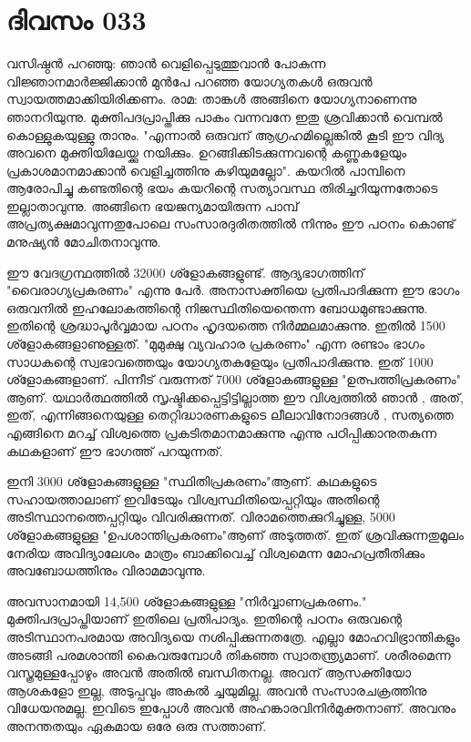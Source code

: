 \newpage
\section{ദിവസം 033}


വസിഷ്ഠന്‍ പറഞ്ഞു: ഞാന്‍ വെളിപ്പെടുത്തുവാന്‍ പോകുന്ന വിജ്ഞാനമാര്‍ജ്ജിക്കാന്‍ മുന്‍പേ പറഞ്ഞ യോഗ്യതകള്‍ ഒരുവന്‍ സ്വായത്തമാക്കിയിരിക്കണം. രാമ: താങ്കള്‍ അങ്ങിനെ യോഗ്യനാണെന്നു ഞാനറിയുന്നു. മുക്തിപദപ്രാപ്തിക്കു പാകം വന്നവനേ ഇതു ശ്രവിക്കാന്‍ വെമ്പല്‍ കൊള്ളുകയുള്ളു താനും. "എന്നാല്‍ ഒരുവന്‌ ആഗ്രഹമില്ലെങ്കില്‍ കൂടി ഈ വിദ്യ അവനെ മുക്തിയിലേയ്ക്കു നയിക്കും. ഉറങ്ങിക്കിടക്കുന്നവന്റെ കണ്ണുകളേയും പ്രകാശമാനമാക്കാന്‍ വെളിച്ചത്തിനു കഴിയുമല്ലോ". കയറില്‍ പാമ്പിനെ ആരോപിച്ചു കണ്ടതിന്റെ ഭയം കയറിന്റെ സത്യാവസ്ഥ തിരിച്ചറിയുന്നതോടെ ഇല്ലാതാവുന്നു. അങ്ങിനെ ഭയജന്യമായിരുന്ന പാമ്പ്‌ അപ്രത്യക്ഷമാവുന്നതുപോലെ സംസാരദുരിതത്തില്‍ നിന്നും ഈ പഠനം കൊണ്ട്‌ മനുഷ്യന്‍ മോചിതനാവുന്നു.

ഈ വേദഗ്രന്ഥത്തില്‍ 32000 ശ്ളോകങ്ങളുണ്ട്‌. ആദ്യഭാഗത്തിന്‌  "വൈരാഗ്യപ്രകരണം" എന്നു പേര്‍. അനാസക്തിയെ പ്രതിപാദിക്കുന്ന ഈ ഭാഗം ഒരുവനില്‍ ഇഹലോകത്തിന്റെ നിജസ്ഥിതിയെന്തെന്ന ബോധമുണ്ടാക്കുന്നു. ഇതിന്റെ ശ്രദ്ധാപൂര്‍വ്വമായ പഠനം ഹൃദയത്തെ നിര്‍മ്മലമാക്കുന്നു. ഇതില്‍ 1500 ശ്ളോകങ്ങളാണുള്ളത്‌. "മുമുക്ഷു വ്യവഹാര പ്രകരണം" എന്ന രണ്ടാം ഭാഗം സാധകന്റെ സ്വഭാവത്തെയും യോഗ്യതകളേയും പ്രതിപാദിക്കുന്നു. ഇത്‌ 1000 ശ്ളോകങ്ങളാണ്‌. പിന്നീട്‌ വരുന്നത്‌ 7000 ശ്ളോകങ്ങളുള്ള "ഉത്പത്തിപ്രകരണം" ആണ്‌. യഥാര്‍ത്ഥത്തില്‍ സൃഷ്ടിക്കപ്പെട്ടിട്ടില്ലാത്ത ഈ വിശ്വത്തില്‍ ഞാന്‍ , അത്‌, ഇത്‌, എന്നിങ്ങനെയുള്ള തെറ്റിദ്ധാരണകളുടെ ലീലാവിനോദങ്ങള്‍ , സത്യത്തെ എങ്ങിനെ  മറച്ച്‌ വിശ്വത്തെ പ്രകടിതമാനമാക്കുന്നു എന്നു പഠിപ്പിക്കാനുതകുന്ന കഥകളാണ്‌ ഈ ഭാഗത്ത്‌ പറയുന്നത്‌.

ഇനി 3000 ശ്ളോകങ്ങളുള്ള "സ്ഥിതിപ്രകരണം"ആണ്‌. കഥകളുടെ സഹായത്താലാണ്‌ ഇവിടേയും വിശ്വസ്ഥിതിയെപ്പറ്റിയും അതിന്റെ അടിസ്ഥാനത്തെപ്പറ്റിയും വിവരിക്കുന്നത്‌. വിരാമത്തെക്കുറിച്ചുള്ള, 5000 ശ്ളോകങ്ങളുള്ള "ഉപശാന്തിപ്രകരണം"ആണ്‌ അടുത്തത്‌. ഇത്‌ ശ്രവിക്കുന്നതുമൂലം നേരിയ അവിദ്യാലേശം മാത്രം ബാക്കിവെച്ച്‌ വിശ്വമെന്ന മോഹപ്രതീതിക്കും അവബോധത്തിനും വിരാമമാവുന്നു.

അവസാനമായി 14,500 ശ്ളോകങ്ങളുള്ള "നിര്‍വ്വാണപ്രകരണം." മുക്തിപദപ്രാപ്തിയാണ്‌ ഇതിലെ പ്രതിപാദ്യം. ഇതിന്റെ പഠനം ഒരുവന്റെ അടിസ്ഥാനപരമായ അവിദ്യയെ നശിപ്പിക്കുന്നതത്രേ. എല്ലാ മോഹവിഭ്രാന്തികളും അടങ്ങി പരമശാന്തി കൈവരുമ്പോള്‍ തികഞ്ഞ സ്വാതന്ത്ര്യമാണ്‌. ശരീരമെന്ന വസ്ത്രമുള്ളപ്പോഴും അവന്‍ അതില്‍ ബന്ധിതനല്ല. അവന്‌ ആസക്തിയോ ആശകളോ ഇല്ല, അടുപ്പവും അകല്‍ ച്ചയുമില്ല. അവന്‍ സംസാരചക്രത്തിനു വിധേയനുമല്ല. ഇവിടെ ഇപ്പോള്‍ അവന്‍ അഹങ്കാരവിനിര്‍മുക്തനാണ്‌. അവനും അനന്തതയും ഏകമായ ഒരേ ഒരു സത്താണ്‌.
